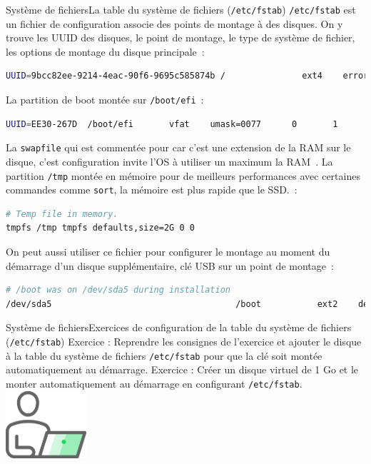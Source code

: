 \documentclass{beamer}
\begin{document}
    \begin{frame}[fragile]{Système de fichiers}{La table du système de fichiers (\lstinline{/etc/fstab})}
        \lstinline{/etc/fstab} est un fichier de configuration associe des points de montage à des disques.
        On y trouve les UUID des disques, le point de montage, le type de système de fichier, les options de montage du disque principale~:
        \begin{lstlisting}[language=bash,basicstyle=\tiny\ttfamily]
UUID=9bcc82ee-9214-4eac-90f6-9695c585874b /               ext4    errors=remount-ro 0       1
        \end{lstlisting}
        La partition de boot montée sur \lstinline{/boot/efi}~:
        \begin{lstlisting}[language=bash,basicstyle=\tiny\ttfamily]
UUID=EE30-267D  /boot/efi       vfat    umask=0077      0       1
        \end{lstlisting}
        La \lstinline{swapfile} qui est commentée pour car c'est une extension de la RAM sur le disque, c'est configuration invite l'OS à utiliser un maximum la RAM~.
        La partition \lstinline{/tmp} montée en mémoire pour de meilleurs performances avec certaines commandes comme \lstinline{sort}, la mémoire est plus rapide que le SSD.~:
        \begin{lstlisting}[language=bash,basicstyle=\tiny\ttfamily]
# Temp file in memory.
tmpfs /tmp tmpfs defaults,size=2G 0 0
        \end{lstlisting}
        On peut aussi utiliser ce fichier pour configurer le montage au moment du démarrage d'un disque supplémentaire, clé USB sur un point de montage~:
        \begin{lstlisting}[language=bash,basicstyle=\tiny\ttfamily]
# /boot was on /dev/sda5 during installation
/dev/sda5                                    /boot           ext2    defaults          0       2
        \end{lstlisting}
    \end{frame}

    \begin{frame}{Système de fichiers}{Exercices de configuration de la table du système de fichiers (\lstinline{/etc/fstab})}
        Exercice \execcounterdispinc: Reprendre les consignes de l'exercice  \theexemountcounter{} et ajouter le disque à la table du système de fichiers \lstinline{/etc/fstab} pour que la clé soit montée automatiquement au démarrage.
        \bigbreak
        Exercice \execcounterdispinc: Créer un disque virtuel de 1 Go et le monter automatiquement au démarrage en configurant \lstinline{/etc/fstab}.
        \bigbreak
        \centering
        \includegraphics[width=3cm]{image/guy-in-front-of-desktop}
    \end{frame}
\end{document}
